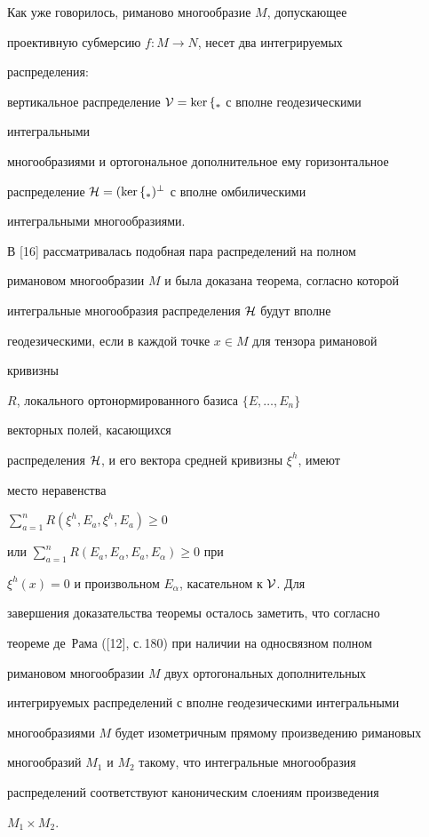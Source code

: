 \begin{pf} Как уже говорилось, риманово многообразие $M$, допускающее 


проективную субмерсию $f:M\to N$, несет два интегрируемых 


распределения: 


вертикальное распределение $\cal V=\ker f_*$ с вполне геодезическими 


интегральными 


многообразиями и ортогональное дополнительное ему горизонтальное 


распределение $\cal H=(\ker f_*)^\bot$ с вполне омбилическими 


интегральными многообразиями. 


В [16] рассматривалась подобная пара распределений на полном 


римановом многообразии $M$ и была доказана теорема, согласно которой 


интегральные многообразия распределения $\cal H$ будут вполне 


геодезическими, если в каждой точке $x\in M$ для тензора римановой 


кривизны 


$R$, локального ортонормированного базиса $\{E,\dotsc,E_n\}$ 


векторных полей, касающихся


распределения $\cal H$, и его вектора средней кривизны $\xi^h$, имеют 


место неравенства 


$\sum\limits^n_{a=1}R(\xi^h,E_a,\xi^h,E_a)\ge 0$ 


или $\sum\limits^n_{a=1}R(E_a,E_\alpha,E_a,E_\alpha)\ge 0$ при 


$\xi^h(x)=0$ и произвольном $E_\alpha$, касательном к $\cal V$. Для 


завершения доказательства теоремы осталось заметить, что согласно 


теореме де~Рама ([12], с.\,180) при наличии на односвязном полном 


римановом многообразии $M$ двух ортогональных дополнительных 


интегрируемых распределений с вполне геодезическими интегральными 


многообразиями $M$ будет изометричным прямому произведению римановых 


многообразий $M_1$ и $M_2$ такому, что интегральные многообразия 


распределений соответствуют каноническим слоениям произведения 


$M_1\times M_2$. 


\end{pf} 


